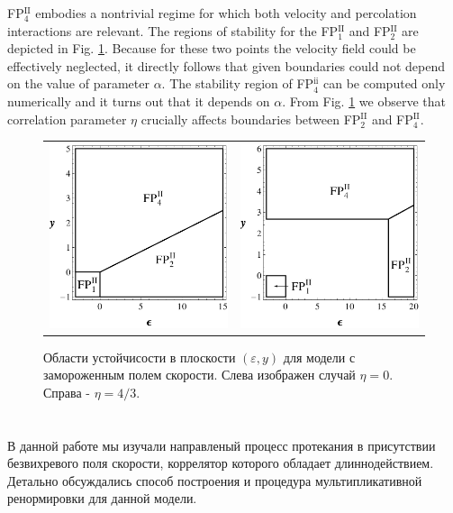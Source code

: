 \documentclass[12pt]{article}
\def\eps{\varepsilon}
\newcommand{\fp}[2]{FP$^{\textrm{#1}}_{#2}$}
\begin{document}
 \fp{II}{4} embodies a nontrivial regime for which both velocity and
percolation interactions are relevant. The regions of stability for the \fp{II}{1} and \fp{II}{2} 
are depicted in Fig. \ref{fig:frozen}. Because for these two points
the velocity field could be effectively neglected, it directly follows that
 given boundaries could not depend on the value of parameter $\alpha$. The stability region
of \fp{ii}{4} can be computed only numerically and it turns out that it depends on $\alpha$. 
From Fig. \ref{fig:frozen} we observe that correlation parameter $\eta$ crucially affects
boundaries between \fp{II}{2} and \fp{II}{4}.
\begin{figure}[h!]
   \centering
   \begin{tabular}{ c c}
     \includegraphics[width=6cm]{FVF_0.pdf}
     &
     \includegraphics[width=6cm]{FVF_4-3.pdf}
   \end{tabular}
   \caption{Области устойчисости в плоскости $(\eps,y)$ для модели с замороженным полем скорости. Слева изображен случай $\eta=0$. Справа - $\eta=4/3$.}
   \label{fig:frozen}
\end{figure}
{\section{} \label{sec:conclu}}
В данной работе мы изучали направленый процесс протекания в присутствии безвихревого поля скорости, коррелятор которого обладает длиннодействием.
Детально обсуждались способ построения и процедура мультипликативной ренормировки для данной модели. 
\end{document}

